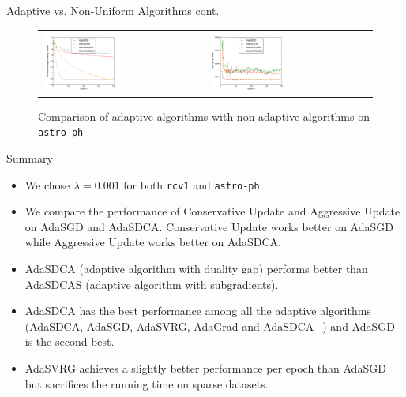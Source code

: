 \begin{frame}{Adaptive vs. Non-Uniform Algorithms cont.}
\begin{figure}[htbp]
\begin{tabular}{ll}
    \centering
        \includegraphics[width=0.5\textwidth]{images/comp_all_obej_astro.pdf} &
        \includegraphics[width=0.5\textwidth]{images/comp_all_terror_astro.pdf}
    \end{tabular}
    \caption{Comparison of adaptive algorithms with non-adaptive algorithms on \texttt{astro-ph}} 
    \label{fig:comp_all2}
\end{figure}
\end{frame}


\begin{frame}{Summary}
\begin{itemize}
	\item We chose $\lambda=0.001$ for both \texttt{rcv1} and \texttt{astro-ph}.
	\item We compare the performance of Conservative Update and Aggressive Update on AdaSGD and AdaSDCA. Conservative Update works better on AdaSGD  while Aggressive Update works better on AdaSDCA.
	\item AdaSDCA (adaptive algorithm with duality gap) performs better than AdaSDCAS (adaptive algorithm with subgradients).
	\item AdaSDCA has the best performance among all the adaptive algorithms (AdaSDCA, AdaSGD, AdaSVRG, AdaGrad and AdaSDCA+) and AdaSGD is the second best.
	\item AdaSVRG achieves a slightly better performance per epoch than AdaSGD but sacrifices the running time on sparse datasets.
\end{itemize}
\end{frame}

